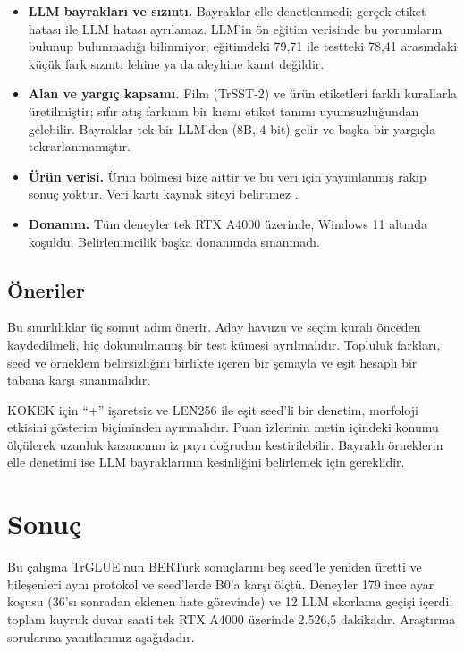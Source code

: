 \documentclass[11pt]{article}
\begin{document}
\begin{itemize}
\item \textbf{LLM bayrakları ve sızıntı.} Bayraklar elle denetlenmedi; gerçek etiket hatası ile LLM hatası ayrılamaz. LLM'in ön eğitim verisinde bu yorumların bulunup bulunmadığı bilinmiyor; eğitimdeki 79,71 ile testteki 78,41 arasındaki küçük fark sızıntı lehine ya da aleyhine kanıt değildir.
\item \textbf{Alan ve yargıç kapsamı.} Film (TrSST-2) ve ürün etiketleri farklı kurallarla üretilmiştir; sıfır atış farkının bir kısmı etiket tanımı uyumsuzluğundan gelebilir. Bayraklar tek bir LLM'den (8B, 4 bit) gelir ve başka bir yargıçla tekrarlanmamıştır.
\item \textbf{Ürün verisi.} Ürün bölmesi bize aittir ve bu veri için yayımlanmış rakip sonuç yoktur. Veri kartı kaynak siteyi belirtmez \citep{turkishproductreviews}.
\item \textbf{Donanım.} Tüm deneyler tek RTX A4000 üzerinde, Windows 11 altında koşuldu. Belirlenimcilik başka donanımda sınanmadı.
\end{itemize}

\subsection{Öneriler}

Bu sınırlılıklar üç somut adım önerir. Aday havuzu ve seçim kuralı önceden kaydedilmeli, hiç dokunulmamış bir test kümesi ayrılmalıdır. Topluluk farkları, seed ve örneklem belirsizliğini birlikte içeren bir şemayla ve eşit hesaplı bir tabana karşı sınanmalıdır.

KOKEK için ``+'' işaretsiz ve LEN256 ile eşit seed'li bir denetim, morfoloji etkisini gösterim biçiminden ayırmalıdır. Puan izlerinin metin içindeki konumu ölçülerek uzunluk kazancının iz payı doğrudan kestirilebilir. Bayraklı örneklerin elle denetimi ise LLM bayraklarının kesinliğini belirlemek için gereklidir.

\section{Sonuç}\label{sec:9}

Bu çalışma TrGLUE'nun BERTurk sonuçlarını beş seed'le yeniden üretti ve bileşenleri aynı protokol ve seed'lerde B0'a karşı ölçtü. Deneyler 179 ince ayar koşusu (36'sı sonradan eklenen hate görevinde) ve 12 LLM skorlama geçişi içerdi; toplam kuyruk duvar saati tek RTX A4000 üzerinde 2.526,5 dakikadır. Araştırma sorularına yanıtlarımız aşağıdadır.
\end{document}
